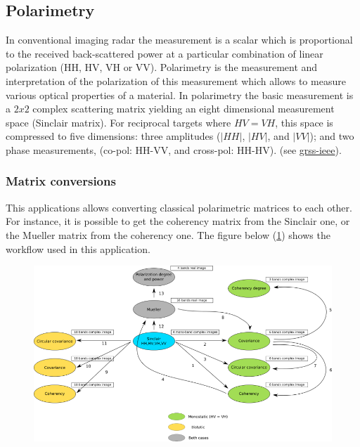 \subsection{Polarimetry}

In conventional imaging radar the measurement is a scalar which is proportional
to the received back-scattered power at a particular combination of linear
polarization (HH, HV, VH or VV). 
Polarimetry is the measurement and interpretation of the polarization of this
measurement which allows to measure various optical properties of a material.
In polarimetry the basic measurement is a $2x2$ complex scattering matrix
yielding an eight dimensional measurement space (Sinclair matrix). For
reciprocal targets where $HV=VH$, this space is compressed to five dimensions:
three amplitudes ($|HH|$, $|HV|$, and $|VV|$); and two phase measurements,
(co-pol: HH-VV, and cross-pol:
HH-HV). (see \href{http://www.grss-ieee.org/technical-briefs/imaging-radar-polarimetry}{grss-ieee}).

\subsubsection{Matrix conversions}

This applications allows converting classical polarimetric matrices to each
other.  For instance, it is possible to get the coherency matrix from the
Sinclair one, or the Mueller matrix from the coherency one.  The figure below
(\ref{fig:polconv}) shows the workflow used in this application.

\begin{figure}[!h]
  \centering
   \includegraphics[width=\textwidth]{../Art/sarpol_conversion_schema.png}
  \label{fig:polconv}
\end{figure}

